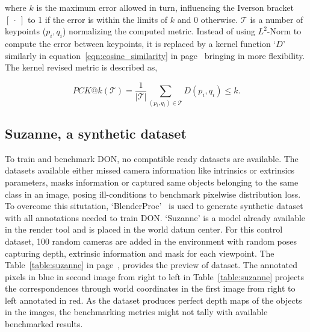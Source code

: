 \noindent where $k$ is the maximum error allowed in turn, influencing the Iverson bracket $[ \ \cdot \ ]$  to 1 if the error is within the limits of $k$ and 0 otherwise.
$\mathcal{T}$ is a number of keypoints ($p_i, q_i$) normalizing the computed metric. Instead of using $L^2$-Norm to compute the error between keypoints, it
is replaced by a kernel function `$D$' similarly in equation~\ref{eqn:cosine_similarity} in page~\pageref{eqn:cosine_similarity} bringing in more flexibility.
The kernel revised metric is described as,

\begin{equation}
    PCK@k(\mathcal{T}) = \dfrac{1}{|\mathcal{T}|} \displaystyle\sum_{(p_i, q_i) \in \mathcal{T}} D(p_i, q_i) \leq k.
\end{equation}


\subsection{Suzanne, a synthetic dataset}

To train and benchmark \ac{DON}, no compatible ready datasets are available. The datasets available either missed camera information like intrinsics or extrinsics parameters,
masks information or captured same objects belonging to the same
class in an image, posing ill-conditions to benchmark pixelwise distribution loss.\\

To overcome this situtation, `BlenderProc'~\cite{blenderproc} is used to generate synthetic dataset with all annotations needed to train \ac{DON}.
`Suzanne' is a model already available in the render tool and is
placed in the world datum center. For this control dataset, 100 random cameras are added in the environment with random poses capturing depth,
extrinsic information and mask for each viewpoint. The Table~\ref{table:suzanne} in page~\pageref{table:suzanne},
provides the preview of dataset. The annotated pixels in blue in second image from right to left in Table~\ref{table:suzanne} projects the correspondences through world
coordinates in the first image from right to left annotated in red. As the dataset produces perfect depth maps of the objects in the images,
the benchmarking metrics might not tally with available benchmarked results.\\


